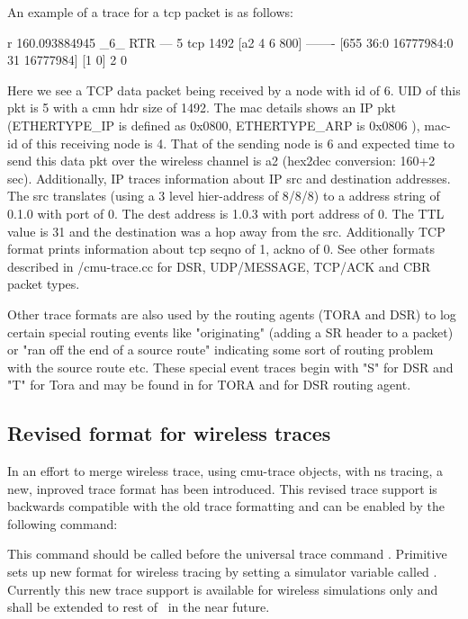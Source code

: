 An example of a trace for a tcp packet is as follows:
\begin{program}
r 160.093884945 _6_ RTR  --- 5 tcp 1492 [a2 4 6 800] ------- [655
36:0 16777984:0 31 16777984] [1 0] 2 0
\end{program}
Here we see a TCP data packet being received by a node with id of 6. UID
of this pkt is 5 with a cmn hdr size of 1492. The mac details shows an IP
pkt (ETHERTYPE\_IP is defined as 0x0800, ETHERTYPE\_ARP is 0x0806 ), mac-id
of this receiving node is 4. That of the sending node is 6 and expected
time to send this data pkt over the wireless channel is a2 (hex2dec
conversion: 160+2 sec). Additionally, IP traces information about IP src
and destination addresses. The src translates (using a 3 level
hier-address of 8/8/8) to a address string of 0.1.0 with port of 0. The
dest address is 1.0.3 with port address of 0. The TTL value is 31 and the
destination was a hop away from the src. Additionally TCP format prints
information about tcp seqno of 1, ackno of 0. See other formats described
in \nsf/cmu-trace.cc for DSR, UDP/MESSAGE, TCP/ACK and CBR packet types.

Other trace formats are also used by the routing agents (TORA and DSR) to
log certain special routing events like "originating" (adding a SR header
to a packet) or  "ran off the end of a source route" indicating some sort
of routing problem with the source route etc. These special event traces
begin with "S" for DSR and "T" for Tora and may
be found in  for TORA and  for DSR
routing agent.


\subsection{Revised format for wireless traces}
\label{sec:revtraceformat}

In an effort to merge wireless trace, using cmu-trace objects, with
ns tracing, a new, inproved trace format has been introduced. This revised
trace support is backwards compatible with the old trace formatting and
can be enabled by the following command:
This command should be called before the universal trace command
. Primitive  sets up new
format for wireless tracing by setting a simulator variable called
. Currently this new trace support is available for
wireless simulations only and shall be extended to rest of \ns\ in the near
future.

